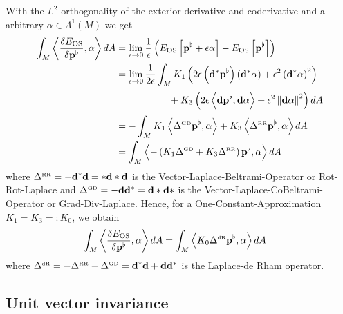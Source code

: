 \documentclass{scrartcl}
\newcommand{\exd}{\mathbf{d}}
\newcommand{\excod}{\exd^{*}} %
\newcommand{\M}{M}
\newcommand{\dA}{dA}
\newcommand{\pfl}{\mathbf{p}^{\flat}}
\newcommand{\EOS}{E_{\text{OS}}}
\newcommand{\LB}{\Delta^{\text{\tiny RR}}}
\newcommand{\LCB}{\Delta^{\text{\tiny GD}}}
\newcommand{\LDR}{\Delta^{\text{\tiny dR}}}
\begin{document}
  With the  \( L^{2} \)-orthogonality of the exterior derivative and coderivative and a arbitrary \( \alpha\in\Lambda^{1}(M) \) we get
  \begin{align}
    \int_{\M} \left\langle\frac{\delta\EOS}{\delta\pfl} , \alpha \right\rangle \dA
      &= \lim_{\epsilon\rightarrow 0} \frac{1}{\epsilon}\left( \EOS\left[ \pfl + \epsilon\alpha \right] - \EOS\left[ \pfl\right]\right) \\
      &=  \lim_{\epsilon\rightarrow 0} \frac{1}{2\epsilon} \int_{\M} 
                K_{1}\left( 2\epsilon \left( \excod\pfl \right)\left( \excod\alpha \right) 
                            + \epsilon^{2}\left( \excod\alpha \right)^{2} \right) \\
      &\phantom{= \lim_{\epsilon\rightarrow 0} \frac{1}{2\epsilon} \int_{\M}}
                +K_{3}\left(2\epsilon\left\langle \exd\pfl, \exd\alpha \right\rangle
                            + \epsilon^{2}\left\| \exd\alpha \right\|^{2}\right)\dA \\
      &= -\int_{\M} K_{1} \left\langle \LCB\pfl, \alpha \right\rangle + K_{3} \left\langle \LB\pfl, \alpha \right\rangle \dA \\
      &= \int_{\M} \left\langle -\left( K_{1}\LCB + K_{3}\LB\right)\pfl , \alpha \right\rangle \dA
  \end{align}
  where \( \LB = -\excod\exd = *\exd *\exd  \) is the Vector-Laplace-Beltrami-Operator or Rot-Rot-Laplace 
  and \( \LCB = - \exd\excod = \exd * \exd * \) is the Vector-Laplace-CoBeltrami-Operator or Grad-Div-Laplace.
  Hence, for a One-Constant-Approximation \( K_{1} = K_{3} =: K_{0} \), we obtain
  \begin{align}
    \int_{\M} \left\langle\frac{\delta\EOS}{\delta\pfl} , \alpha \right\rangle \dA
     &= \int_{\M} \left\langle K_{0}\LDR\pfl , \alpha \right\rangle \dA
  \end{align}
  where \( \LDR = -\LB - \LCB = \excod\exd + \exd\excod\) is the Laplace-de Rham operator.
  
  \subsection{Unit vector invariance}
  
\end{document}
